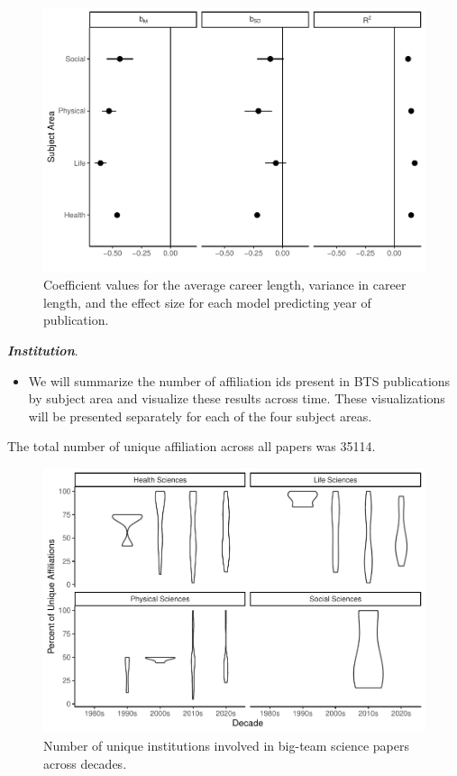 \documentclass[
  man]{apa7}
\providecommand{\tightlist}{%
  \setlength{\itemsep}{0pt}\setlength{\parskip}{0pt}}
\begin{document}
\begin{figure}
\centering
\includegraphics{manuscript_scopus_files/figure-latex/fig-career-results-1.pdf}
\caption{\label{fig:fig-career-results}Coefficient values for the average career length, variance in career length, and the effect size for each model predicting year of publication.}
\end{figure}

\textbf{\emph{Institution}}.

\begin{itemize}
\tightlist
\item
  We will summarize the number of affiliation ids present in BTS
  publications by subject area and visualize these results across
  time. These visualizations will be presented separately for each of
  the four subject areas.
\end{itemize}

The total number of unique affiliation across all papers was 35114.

\begin{figure}
\centering
\includegraphics{manuscript_scopus_files/figure-latex/fig-inst-1.pdf}
\caption{\label{fig:fig-inst}Number of unique institutions involved in big-team science papers across decades.}
\end{figure}
\end{document}
